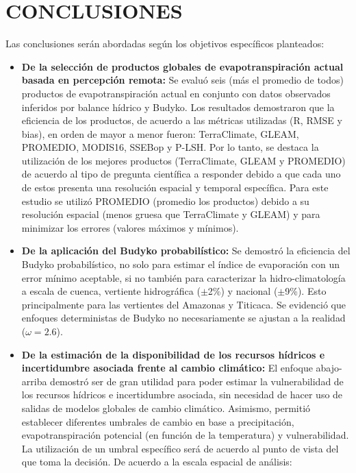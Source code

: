 \documentclass[12pt]{article}
\begin{document}
\clearpage
\thispagestyle{empty}

\clearpage

\vspace*{0.5mm}
\section{CONCLUSIONES}

\thispagestyle{empty}

Las conclusiones serán abordadas según los objetivos específicos planteados:

\begin{itemize}
    \item \textbf{De la selección de productos globales de evapotranspiración actual basada en percepción remota:} Se evaluó seis (más el promedio de todos) productos de evapotranspiración actual en conjunto con datos observados inferidos por balance hídrico y Budyko. Los resultados demostraron que la eficiencia de los productos, de acuerdo a las métricas utilizadas (R, RMSE y bias), en orden de mayor a menor fueron: TerraClimate, GLEAM, PROMEDIO, MODIS16, SSEBop y P-LSH. Por lo tanto, se destaca la utilización de los mejores productos (TerraClimate, GLEAM y PROMEDIO) de acuerdo al tipo de pregunta científica a responder debido a que cada uno de estos presenta una resolución espacial y temporal específica. Para este estudio se utilizó PROMEDIO (promedio los productos) debido a su resolución espacial (menos gruesa que TerraClimate y GLEAM) y para minimizar los errores (valores máximos y mínimos).
   
    \item \textbf{De la aplicación del Budyko probabilístico:}
    Se demostró la eficiencia del Budyko probabilístico, no solo para estimar el índice de evaporación con un error mínimo aceptable, si no también para caracterizar la hidro-climatología a escala de cuenca, vertiente hidrográfica ($\pm$2\%) y nacional ($\pm$9\%). Esto principalmente para las vertientes del Amazonas y Titicaca. Se evidenció que enfoques deterministas de Budyko no necesariamente se ajustan a la realidad ($\omega = 2.6$).
    
    \item \textbf{De la estimación de la disponibilidad de los recursos hídricos e incertidumbre asociada frente al cambio climático:} El enfoque abajo-arriba demostró ser de gran utilidad para poder estimar la vulnerabilidad de los recursos hídricos e incertidumbre asociada, sin necesidad de hacer uso de salidas de modelos globales de cambio climático. Asimismo, permitió establecer diferentes umbrales de cambio en base a precipitación, evapotranspiración potencial (en función de la temperatura) y vulnerabilidad. La utilización de un umbral específico será de acuerdo al punto de vista del que toma la decisión. De acuerdo a la escala espacial de análisis:
    

\end{itemize}
\end{document}
